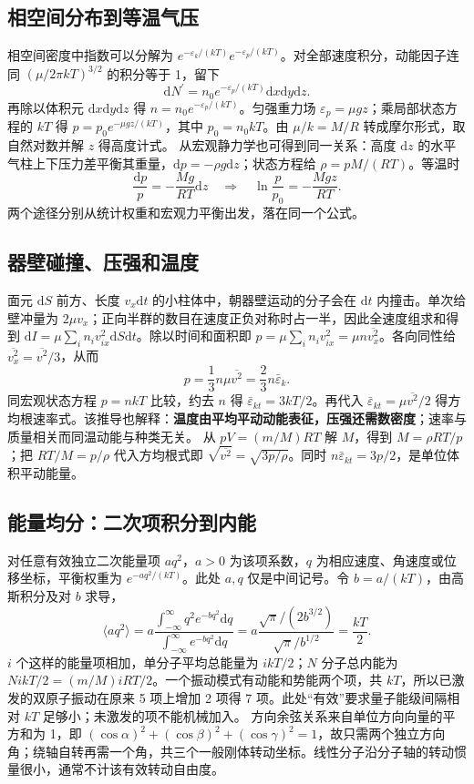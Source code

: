 \documentclass[UTF8,fontset=none,zihao=-4,a4paper]{ctexart}
\begin{document}
\subsection{相空间分布到等温气压}
相空间密度中指数可以分解为 $e^{-\varepsilon_k/(kT)}e^{-\varepsilon_p/(kT)}$。对全部速度积分，动能因子连同 $(\mu/2\pi kT)^{3/2}$ 的积分等于 1，留下
\[
\mathrm dN^{\prime}=n_0e^{-\varepsilon_p/(kT)}\mathrm dx\mathrm dy\mathrm dz.
\]
再除以体积元 $\mathrm dx\mathrm dy\mathrm dz$ 得 $n=n_0e^{-\varepsilon_p/(kT)}$。匀强重力场 $\varepsilon_p=\mu gz$；乘局部状态方程的 $kT$ 得 $p=p_0e^{-\mu gz/(kT)}$，其中 $p_0=n_0kT$。由 $\mu/k=M/R$ 转成摩尔形式，取自然对数并解 $z$ 得高度计式。
从宏观静力学也可得到同一关系：高度 $\mathrm dz$ 的水平气柱上下压力差平衡其重量，$\mathrm dp=-\rho g\mathrm dz$；状态方程给 $\rho=pM/(RT)$。等温时
\[
\frac{\mathrm dp}p=-\frac{Mg}{RT}\mathrm dz
\quad\Longrightarrow\quad\ln\frac p{p_0}=-\frac{Mgz}{RT}.
\]
两个途径分别从统计权重和宏观力平衡出发，落在同一个公式。

\subsection{器壁碰撞、压强和温度}
面元 $\mathrm dS$ 前方、长度 $v_x\mathrm dt$ 的小柱体中，朝器壁运动的分子会在 $\mathrm dt$ 内撞击。单次给壁冲量为 $2\mu v_x$；正向半群的数目在速度正负对称时占一半，因此全速度组求和得到 $\mathrm dI=\mu\sum_i n_iv_{ix}^2\mathrm dS\mathrm dt$。除以时间和面积即 $p=\mu\sum_i n_iv_{ix}^2=\mu n\overline{v_x^2}$。各向同性给 $\overline{v_x^2}=\overline{v^2}/3$，从而
\[
p=\frac13n\mu\overline{v^2}=\frac23n\bar\varepsilon_k.
\]
同宏观状态方程 $p=nkT$ 比较，约去 $n$ 得 $\bar\varepsilon_{kt}=3kT/2$。再代入 $\bar\varepsilon_{kt}=\mu\overline{v^2}/2$ 得方均根速率式。该推导也解释：\textbf{温度由平均平动动能表征，压强还需数密度}；速率与质量相关而同温动能与种类无关。
从 $pV=(m/M)RT$ 解 $M$，得到 $M=\rho RT/p$；把 $RT/M=p/\rho$ 代入方均根式即 $\sqrt{\overline{v^2}}=\sqrt{3p/\rho}$。同时 $n\bar\varepsilon_{kt}=3p/2$，是单位体积平动能量。

\subsection{能量均分：二次项积分到内能}
对任意有效独立二次能量项 $aq^2$，$a>0$ 为该项系数，$q$ 为相应速度、角速度或位移坐标，平衡权重为 $e^{-aq^2/(kT)}$。此处 $a,q$ 仅是中间记号。令 $b=a/(kT)$，由高斯积分及对 $b$ 求导，
\[
\langle aq^2\rangle=a\frac{\int_{-\infty}^{\infty}q^2e^{-bq^2}\mathrm dq}{\int_{-\infty}^{\infty}e^{-bq^2}\mathrm dq}
=a\frac{\sqrt\pi/(2b^{3/2})}{\sqrt\pi/b^{1/2}}=\frac{kT}{2}.
\]
$i$ 个这样的能量项相加，单分子平均总能量为 $ikT/2$；$N$ 分子总内能为 $NikT/2=(m/M)iRT/2$。一个振动模式有动能和势能两个项，共 $kT$，所以已激发的双原子振动在原来 5 项上增加 2 项得 7 项。此处“有效”要求量子能级间隔相对 $kT$ 足够小；未激发的项不能机械加入。
方向余弦关系来自单位方向向量的平方和为 1，即 $(\cos\alpha)^2+(\cos\beta)^2+(\cos\gamma)^2=1$，故只需两个独立方向角；绕轴自转再需一个角，共三个一般刚体转动坐标。线性分子沿分子轴的转动惯量很小，通常不计该有效转动自由度。
\end{document}
